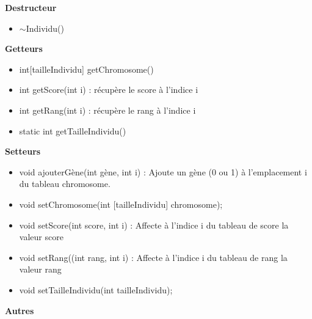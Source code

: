 \documentclass[a4paper,11pt]{article}
\begin{document}
			\textbf{Destructeur}
				\begin{itemize}
					\item $\sim$Individu()\\
				\end{itemize}
			\textbf{Getteurs}
					\begin{itemize}
							\item int[tailleIndividu] getChromosome()
							\item int getScore(int i) : récupère le score à l’indice i
							\item int getRang(int i) : récupère le rang à l’indice i
							\item static int getTailleIndividu()\\
					\end{itemize}
			\textbf{Setteurs}
					\begin{itemize}
							\item void ajouterGène(int gène, int i) : Ajoute un gène (0 ou 1) à l’emplacement i du tableau chromosome.
							\item void setChromosome(int [tailleIndividu] chromosome);
							\item void setScore(int score, int i) : Affecte à l’indice i du tableau de score la valeur score
							\item void setRang((int rang, int i) : Affecte à l’indice i du tableau de rang la valeur rang
							\item void setTailleIndividu(int tailleIndividu);\\
					\end{itemize}
			\textbf{Autres}
\end{document}
